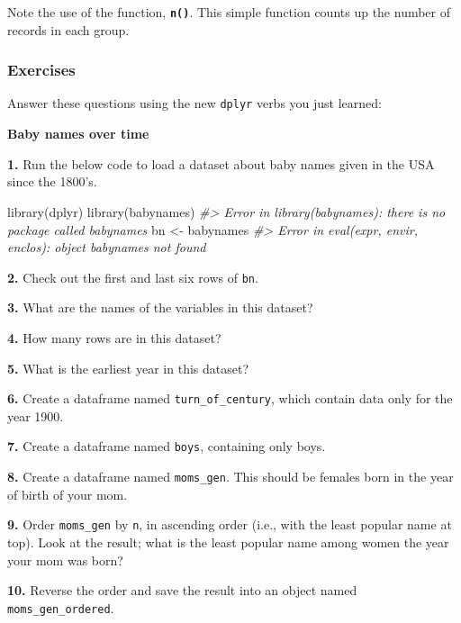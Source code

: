 \documentclass[
]{book}
\newenvironment{Shaded}{\begin{snugshade}}{\end{snugshade}}
\newcommand{\CommentTok}[1]{\textcolor[rgb]{0.56,0.35,0.01}{\textit{#1}}}
\newcommand{\FunctionTok}[1]{\textcolor[rgb]{0.00,0.00,0.00}{#1}}
\newcommand{\NormalTok}[1]{#1}
\newcommand{\OtherTok}[1]{\textcolor[rgb]{0.56,0.35,0.01}{#1}}
\begin{document}
Note the use of the function, \textbf{\texttt{n()}}. This simple function counts up the number of records in each group.

\hypertarget{exercises-6}{%
\subsubsection*{Exercises}\label{exercises-6}}

Answer these questions using the new \texttt{dplyr} verbs you just learned:

\textbf{Baby names over time}

\textbf{1.} Run the below code to load a dataset about baby names given in the USA since the 1800's.

\begin{Shaded}
\begin{Highlighting}[]
\FunctionTok{library}\NormalTok{(dplyr)}
\FunctionTok{library}\NormalTok{(babynames)}
\CommentTok{\#\textgreater{} Error in library(babynames): there is no package called \textquotesingle{}babynames\textquotesingle{}}
\NormalTok{bn }\OtherTok{\textless{}{-}}\NormalTok{ babynames}
\CommentTok{\#\textgreater{} Error in eval(expr, envir, enclos): object \textquotesingle{}babynames\textquotesingle{} not found}
\end{Highlighting}
\end{Shaded}

\textbf{2.} Check out the first and last six rows of \texttt{bn}.

\textbf{3.} What are the names of the variables in this dataset?

\textbf{4.} How many rows are in this dataset?

\textbf{5.} What is the earliest year in this dataset?

\textbf{6.} Create a dataframe named \texttt{turn\_of\_century}, which contain data only for the year 1900.

\textbf{7.} Create a dataframe named \texttt{boys}, containing only boys.

\textbf{8.} Create a dataframe named \texttt{moms\_gen}. This should be females born in the year of birth of your mom.

\textbf{9.} Order \texttt{moms\_gen} by \texttt{n}, in ascending order (i.e., with the least popular name at top). Look at the result; what is the least popular name among women the year your mom was born?

\textbf{10.} Reverse the order and save the result into an object named \texttt{moms\_gen\_ordered}.
\end{document}
